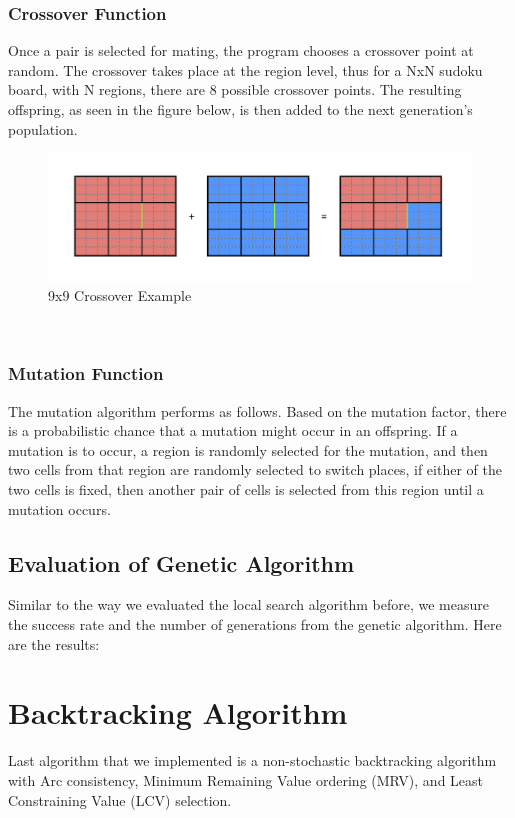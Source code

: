 \documentclass[12pt, a4paper]{article}
\begin{document}
			\subsubsection{Crossover Function}
			Once a pair is selected for mating, the program chooses a crossover point at random. The crossover takes place at the region level, thus for a NxN sudoku board, with N regions, there are 8 possible crossover points. The resulting offspring, as seen in the figure below, is then added to the next generation's population.
			\begin{figure}[h]
				\begin{center} 
					\includegraphics[width=6in]{Crossover.png}
					\caption{9x9 Crossover Example} 
					\label{fig:crossover}
				\end{center} 
			\end{figure}\\
			\subsubsection{Mutation Function}
			The mutation algorithm performs as follows. Based on the mutation factor, there is a probabilistic chance that a mutation might occur in an offspring. If a mutation is to occur, a region is randomly selected for the mutation, and then two cells from that region are randomly selected to switch places, if either of the two cells is fixed, then another pair of cells is selected from this region until a mutation occurs.
		\subsection{Evaluation of Genetic Algorithm}
			Similar to the way we evaluated the local search algorithm before, we measure the success rate and the number of generations from the genetic algorithm. Here are the results:
	\section{Backtracking Algorithm}
		Last algorithm that we implemented is a non-stochastic backtracking algorithm with Arc consistency, Minimum Remaining Value ordering (MRV), and Least Constraining Value (LCV) selection.
\end{document}
